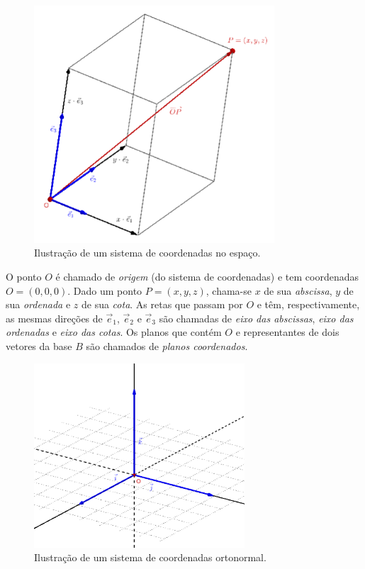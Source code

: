 \begin{figure}[H]
  \centering
  \includegraphics[width=0.8\textwidth]{cap_estudo/dados/fig_scoord/fig}
  \caption{Ilustração de um sistema de coordenadas no espaço.}
  \label{fig:scoord}
\end{figure}

O ponto $O$ é chamado de \emph{origem} (do sistema de coordenadas) e tem coordenadas $O=(0,0,0)$. Dado um ponto $P=(x,y,z)$, chama-se $x$ de sua \emph{abscissa}, $y$ de sua \emph{ordenada} e $z$ de sua \emph{cota}. As retas que passam por $O$ e têm, respectivamente, as mesmas direções de $\vec{e}_1$, $\vec{e}_2$ e $\vec{e}_3$ são chamadas de \emph{eixo das abscissas}, \emph{eixo das ordenadas} e \emph{eixo das cotas}. Os planos que contém $O$ e representantes de dois vetores da base $B$ são chamados de \emph{planos coordenados}.

\begin{figure}[H]
  \centering
  \includegraphics[width=0.7\textwidth]{./cap_estudo/dados/fig_sis_coord_orto/fig}
  \caption{Ilustração de um sistema de coordenadas ortonormal.}
  \label{fig:sis_coord_orto}
\end{figure}

